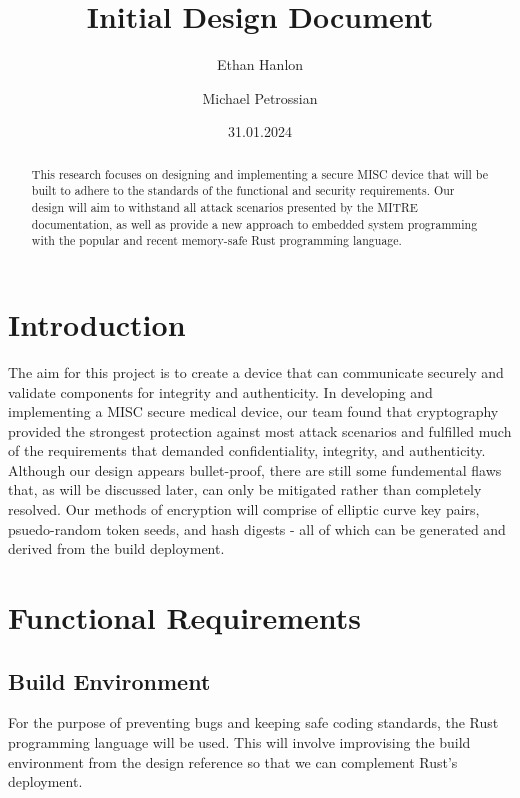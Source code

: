 \documentclass{prace}
\title{Initial Design Document}
\date{31.01.2024}
\author[1]{Ethan Hanlon}
\author[1]{Michael Petrossian}
\affiliation{San Francisco State University, 1600 Holloway Avenue, San Francisco, CA 94132, USA}
\begin{document}
\maketitle
\begin{abstract}
This research focuses on designing and implementing a secure MISC device that will be built to adhere to the standards of the functional and security requirements. Our design will 
aim to withstand all attack scenarios presented by the MITRE documentation, as well as provide a new approach to embedded system programming with the popular and recent memory-safe Rust programming language. 
\end{abstract}

\section{Introduction}

The aim for this project is to create a device that can communicate securely and validate components for integrity and authenticity.
In developing and implementing a MISC secure medical device, our team found that cryptography
provided the strongest protection against most attack scenarios and fulfilled much of the requirements
that demanded confidentiality, integrity, and authenticity. Although our design appears bullet-proof, there are still
some fundemental flaws that, as will be discussed later, can only be mitigated rather than completely resolved. Our methods of encryption will comprise of elliptic curve key pairs, 
psuedo-random token seeds, and hash digests - all of which can be generated and derived from the build deployment.

\section{Functional Requirements}

\subsection{Build Environment}

For the purpose of preventing bugs and keeping safe coding standards, the Rust programming language will be used.
This will involve improvising the build environment from the design reference so that we can complement Rust's deployment. 
\end{document}
